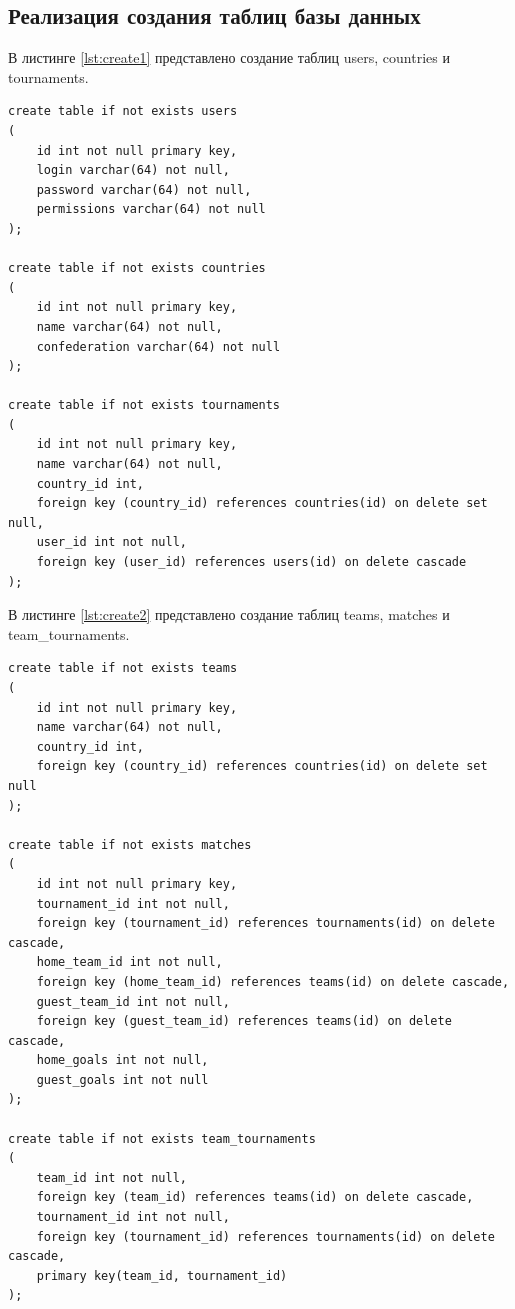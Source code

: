\subsection{Реализация создания таблиц базы данных}
В листинге \ref{lst:create1} представлено создание таблиц users, countries и tournaments.
\begin{lstlisting}[label=lst:create1,caption={Создание таблиц users, countries, tournaments}]
create table if not exists users
(
    id int not null primary key,
    login varchar(64) not null,
    password varchar(64) not null,
    permissions varchar(64) not null
);

create table if not exists countries
(
    id int not null primary key,
    name varchar(64) not null,
    confederation varchar(64) not null
);

create table if not exists tournaments
(
    id int not null primary key,
    name varchar(64) not null,
    country_id int,
    foreign key (country_id) references countries(id) on delete set null,
    user_id int not null,
    foreign key (user_id) references users(id) on delete cascade
);
\end{lstlisting}
В листинге \ref{lst:create2} представлено создание таблиц teams, matches и team\_tournaments.
\newpage
\begin{lstlisting}[label=lst:create2,caption={Создание таблиц teams, matches, team\_tournaments}]
create table if not exists teams
(
    id int not null primary key,
    name varchar(64) not null,
    country_id int,
    foreign key (country_id) references countries(id) on delete set null 
);

create table if not exists matches
(
    id int not null primary key,
    tournament_id int not null,
    foreign key (tournament_id) references tournaments(id) on delete cascade,
    home_team_id int not null,
    foreign key (home_team_id) references teams(id) on delete cascade,
    guest_team_id int not null,
    foreign key (guest_team_id) references teams(id) on delete cascade,
    home_goals int not null,
    guest_goals int not null
);

create table if not exists team_tournaments
(
    team_id int not null,
    foreign key (team_id) references teams(id) on delete cascade,
    tournament_id int not null,
    foreign key (tournament_id) references tournaments(id) on delete cascade,
    primary key(team_id, tournament_id)
);
\end{lstlisting}
